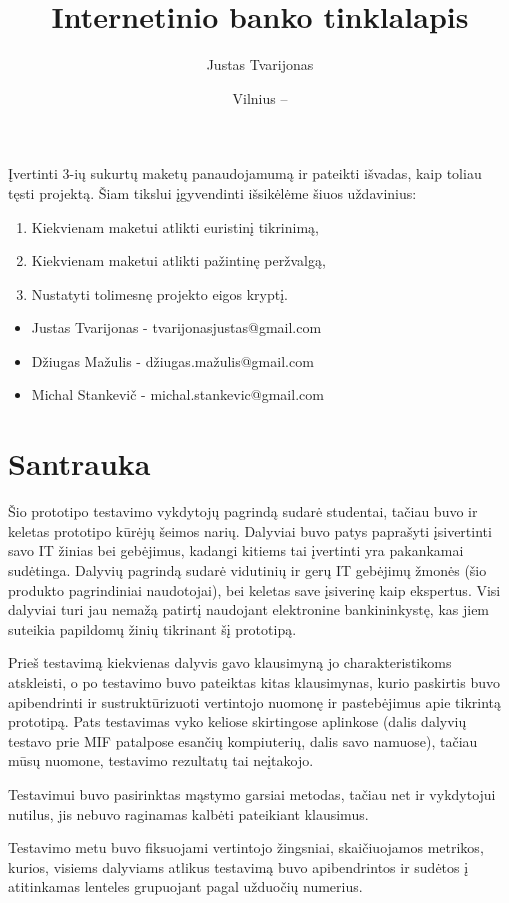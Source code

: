 \documentclass[oneside]{VUMIFPSkursinis}
\title{Internetinio banko tinklalapis}
\author{Justas Tvarijonas}
\date{Vilnius – \the\year}
\begin{document}
\maketitle
{}
Įvertinti 3-ių sukurtų maketų panaudojamumą ir pateikti išvadas, kaip toliau tęsti projektą. Šiam tikslui įgyvendinti išsikėlėme šiuos uždavinius:
\begin{enumerate}
	\item Kiekvienam maketui atlikti euristinį tikrinimą,
	\item Kiekvienam maketui atlikti pažintinę peržvalgą,
	\item Nustatyti tolimesnę projekto eigos kryptį.
\end{enumerate}
\begin{itemize}
	\item Justas Tvarijonas - tvarijonasjustas@gmail.com
	\item Džiugas Mažulis - džiugas.mažulis@gmail.com
	\item Michal Stankevič - michal.stankevic@gmail.com 
\end{itemize}
\tableofcontents
\section{Santrauka}
Šio prototipo testavimo vykdytojų pagrindą sudarė studentai, tačiau buvo ir keletas prototipo kūrėjų šeimos narių. Dalyviai buvo patys paprašyti įsivertinti savo IT žinias bei gebėjimus, kadangi kitiems tai įvertinti yra pakankamai sudėtinga. Dalyvių pagrindą sudarė vidutinių ir gerų IT gebėjimų žmonės (šio produkto pagrindiniai naudotojai), bei keletas save įsiverinę kaip ekspertus. Visi dalyviai turi jau nemažą patirtį naudojant elektronine bankininkystę, kas jiem suteikia papildomų žinių tikrinant šį prototipą. \par
Prieš testavimą kiekvienas dalyvis gavo klausimyną jo charakteristikoms atskleisti, o po testavimo buvo pateiktas kitas klausimynas, kurio paskirtis buvo apibendrinti ir sustruktūrizuoti vertintojo nuomonę ir pastebėjimus apie tikrintą prototipą. Pats testavimas vyko keliose skirtingose aplinkose (dalis dalyvių testavo prie MIF patalpose esančių kompiuterių, dalis savo namuose), tačiau mūsų nuomone, testavimo rezultatų tai neįtakojo. \par
Testavimui buvo pasirinktas mąstymo garsiai metodas, tačiau net ir vykdytojui nutilus, jis nebuvo raginamas kalbėti pateikiant klausimus. \par
Testavimo metu buvo fiksuojami vertintojo žingsniai, skaičiuojamos metrikos, kurios, visiems dalyviams atlikus testavimą buvo apibendrintos ir sudėtos į atitinkamas lenteles grupuojant pagal užduočių numerius.
\end{document}
